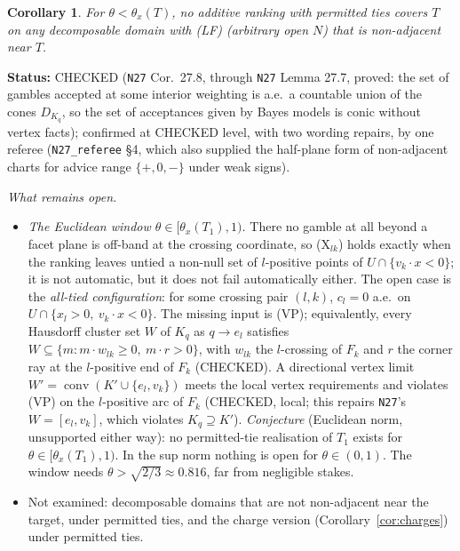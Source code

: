 \documentclass[11pt]{article}
\newtheorem{corollary}[theorem]{Corollary}
\theoremstyle{definition}
\theoremstyle{remark}
\newcommand{\co}{\operatorname{conv}}
\newcommand{\src}[1]{\texttt{#1}}
\newcommand{\status}[1]{\par\smallskip\noindent\textbf{Status:} #1\par\smallskip}
\begin{document}
\begin{corollary}\label{cor:permitted-nonadj}
For $\theta<\theta_x(T)$, no additive ranking with permitted ties covers $T$ on any decomposable domain with (LF) (arbitrary open $N$) that is non-adjacent near $T$.
\end{corollary}
\status{CHECKED (\src{N27} Cor.~27.8, through \src{N27} Lemma 27.7, proved: the set of gambles accepted at some interior weighting is a.e.\ a countable union of the cones $D_{K_q}$, so the set of acceptances given by Bayes models is conic without vertex facts); confirmed at CHECKED level, with two wording repairs, by one referee (\src{N27\_referee} \S4, which also supplied the half-plane form of non-adjacent charts for advice range $\{+,0,-\}$ under weak signs).}

\emph{What remains open.}
\begin{itemize}[leftmargin=*]
\item \emph{The Euclidean window $\theta\in[\theta_x(T_1),1)$.} There no gamble at all beyond a facet plane is off-band at the crossing coordinate, so (X$_{lk}$) holds exactly when the ranking leaves untied a non-null set of $l$-positive points of $U\cap\{v_k\cdot x<0\}$; it is not automatic, but it does not fail automatically either. The open case is the \emph{all-tied configuration}: for some crossing pair $(l,k)$, $c_l=0$ a.e.\ on $U\cap\{x_l>0,\ v_k\cdot x<0\}$. The missing input is (VP); equivalently, every Hausdorff cluster set $W$ of $K_q$ as $q\to e_l$ satisfies $W\subseteq\{m:m\cdot w_{lk}\ge0,\ m\cdot r>0\}$, with $w_{lk}$ the $l$-crossing of $F_k$ and $r$ the corner ray at the $l$-positive end of $F_k$ (CHECKED). A directional vertex limit $W'=\co(K'\cup\{e_l,v_k\})$ meets the local vertex requirements and violates (VP) on the $l$-positive arc of $F_k$ (CHECKED, local; this repairs \src{N27}'s $W=[e_l,v_k]$, which violates $K_q\supseteq K'$). \emph{Conjecture} (Euclidean norm, unsupported either way): no permitted-tie realisation of $T_1$ exists for $\theta\in[\theta_x(T_1),1)$. In the sup norm nothing is open for $\theta\in(0,1)$. The window needs $\theta>\sqrt{2/3}\approx0.816$, far from negligible stakes.
\item Not examined: decomposable domains that are not non-adjacent near the target, under permitted ties, and the charge version (Corollary~\ref{cor:charges}) under permitted ties.
\end{itemize}
\end{document}
